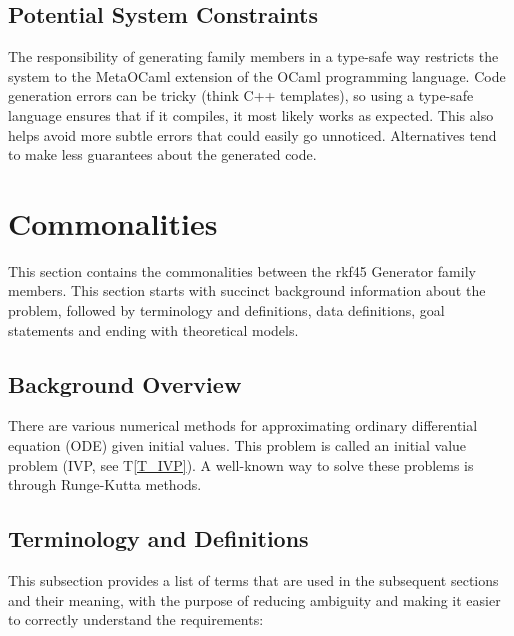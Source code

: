 \documentclass[12pt]{article}
\newcommand{\tref}[1]{T\ref{#1}}
\newcommand{\famname}{rkf45 Generator} %
\begin{document}
                          
\subsection{Potential System Constraints}

The responsibility of generating family members in a type-safe way restricts 
the system to the MetaOCaml extension of the OCaml programming language.
Code generation errors can be tricky (think C++ templates), so using a 
type-safe language ensures that if it compiles, it most likely works as 
expected.
This also helps avoid more subtle errors that could easily go unnoticed.
Alternatives tend to make less guarantees about the generated code.
\section{Commonalities}

This section contains the commonalities between the \famname{} family members. 
This section starts with succinct background information about the problem, 
followed by terminology and definitions, data definitions, goal statements and 
ending with theoretical models. 

\subsection{Background Overview} \label{Sec_Background}

There are various numerical methods for approximating ordinary differential 
equation (ODE) given initial values. This problem is called an initial value 
problem (IVP, see \tref{T_IVP}). A well-known way to solve these problems is 
through Runge-Kutta methods.%

\subsection{Terminology and  Definitions}

This subsection provides a list of terms that are used in the subsequent
sections and their meaning, with the purpose of reducing ambiguity and making it
easier to correctly understand the requirements:
\end{document}
